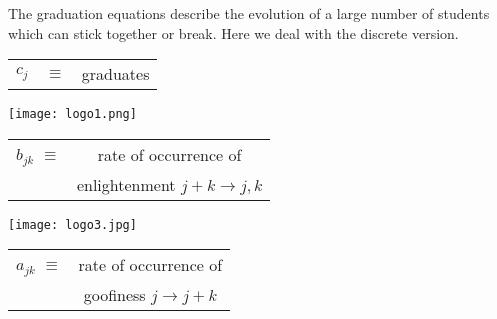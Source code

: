 \documentclass[final]{beamer}
\begin{document}
\begin{frame}
\begin{multicols}{3}
The graduation equations describe the
evolution of a large number of students which can stick together or
break. Here we deal with the discrete version.
\begin{center}

  \begin{tabular}[h]{lll}
    $c_j$  &  $\equiv$  &  graduates
  \end{tabular}

  \vspace{.3cm}


  \begin{minipage}[t]{.4\linewidth}
    \begin{center}

      \texttt{[image: logo1.png]}


      \begin{tabular}{cc}
        $b_{jk}$  $\equiv$ &  rate of occurrence of\\
        &  enlightenment $j+k \to j,k$
      \end{tabular}
    \end{center}
  \end{minipage}
  
  \hspace{.3cm}

  \begin{minipage}[t]{.4\linewidth}
    \begin{center}

      \texttt{[image: logo3.jpg]}


      \begin{tabular}{cc}
        $a_{jk}$   $\equiv$ &  rate of occurrence of\\
        &  goofiness $j \to j+k$
      \end{tabular}
    \end{center}                    
  \end{minipage}

\end{center}

\vspace{.4cm}


\end{multicols}
\end{frame}
\end{document}
